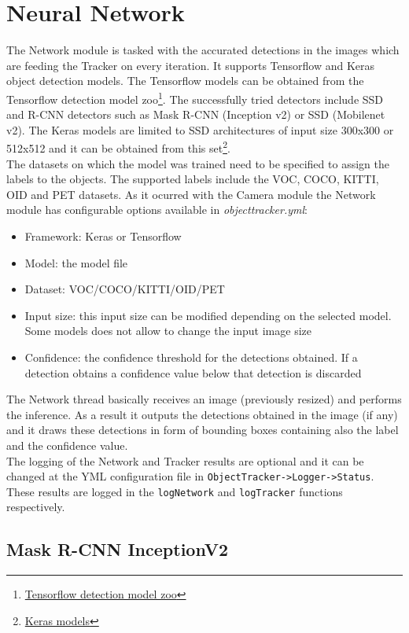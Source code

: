 \section{Neural Network} 
The Network module is tasked with the accurated detections in the images which are feeding the Tracker on every iteration. It supports Tensorflow and Keras object detection models. The Tensorflow models can be obtained from the Tensorflow detection model zoo\footnote{\href {https://github.com/tensorflow/models/blob/master/research/object_detection/g3doc/detection_model_zoo.md}{Tensorflow detection model zoo}}. The successfully tried detectors include SSD and R-CNN detectors such as Mask R-CNN (Inception v2) or SSD (Mobilenet v2). The Keras models are limited to SSD architectures of input size 300x300 or 512x512 and it can be obtained from this set\footnote{\href {https://github.com/pierluigiferrari/ssd_keras#download-the-original-trained-model-weights}{Keras models}}.\\
The datasets on which the model was trained need to be specified to assign the labels to the objects. The supported labels include the VOC, COCO, KITTI, OID and PET datasets. As it ocurred with the Camera module the Network module has configurable options available in \textit{objecttracker.yml}:
\begin{itemize}
    \item Framework: Keras or Tensorflow
    \item Model: the model file
    \item Dataset: VOC/COCO/KITTI/OID/PET
    \item Input size: this input size can be modified depending on the selected model. Some models does not allow to change the input image size
    \item Confidence: the confidence threshold for the detections obtained. If a detection obtains a confidence value below that detection is discarded
\end{itemize}
The Network thread basically receives an image (previously resized) and performs the inference. As a result it outputs the detections obtained in the image (if any) and it draws these detections in form of bounding boxes containing also the label and the confidence value.\\
The logging of the Network and Tracker results are optional and it can be changed at the YML configuration file in \texttt{ObjectTracker->Logger->Status}. These results are logged in the \texttt{logNetwork} and \texttt{logTracker} functions respectively.
\subsection{Mask R-CNN InceptionV2}
